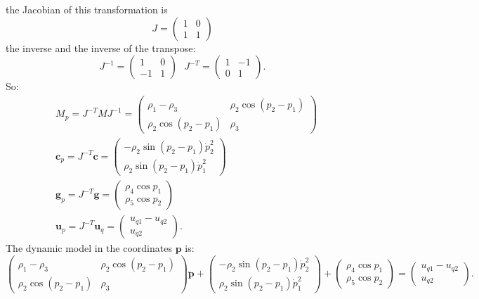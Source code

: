 \documentclass[10pt, a4paper]{report}
\begin{document}
the Jacobian of this transformation is\begin{equation}
    J=\begin{pmatrix}
        1&0\\1&1
    \end{pmatrix}
\end{equation}
the inverse and the inverse of the transpose:\begin{equation}
    J^{-1}=\begin{pmatrix}
        1&0\\-1&1
    \end{pmatrix} \ \ \  J^{-T}=\begin{pmatrix}
        1&-1\\0&1
    \end{pmatrix}.
\end{equation}
So:\begin{align}
    &M_p=J^{-T}MJ^{-1}=\begin{pmatrix}
        \rho_1-\rho_3&\rho_2\cos(p_2-p_1)\\ 
        \rho_2\cos(p_2-p_1)&\rho_3
    \end{pmatrix}\\[1.5ex]
    &\mathbf c_p=J^{-T}\mathbf c=\begin{pmatrix}
        -\rho_2\sin(p_2-p_1)\dot p_2^2\\ 
        \rho_2\sin(p_2-p_1)\dot p_1^2
    \end{pmatrix}\\[1.5ex]
    &\mathbf g_p=J^{-T}\mathbf g=\begin{pmatrix}
        \rho_4\cos p_1\\ 
        \rho_5\cos p_2
    \end{pmatrix}\\[1.5ex]
    &\mathbf u_p=J^{-T}\mathbf u_q=\begin{pmatrix}
        u_{q1}-u_{q2}\\
        u_{q2}
    \end{pmatrix}.
\end{align}
The dynamic model in the coordinates $\mathbf p$ is:\begin{equation}
    \begin{pmatrix}
        \rho_1-\rho_3&\rho_2\cos(p_2-p_1)\\ 
        \rho_2\cos(p_2-p_1)&\rho_3
    \end{pmatrix}\ddot{\mathbf p}+\begin{pmatrix}
        -\rho_2\sin(p_2-p_1)\dot p_2^2\\ 
        \rho_2\sin(p_2-p_1)\dot p_1^2
    \end{pmatrix}+\begin{pmatrix}
        \rho_4\cos p_1\\ 
        \rho_5\cos p_2
    \end{pmatrix}=\begin{pmatrix}
        u_{q1}-u_{q2}\\
        u_{q2}
    \end{pmatrix}
    .
\end{equation}
\end{document}
